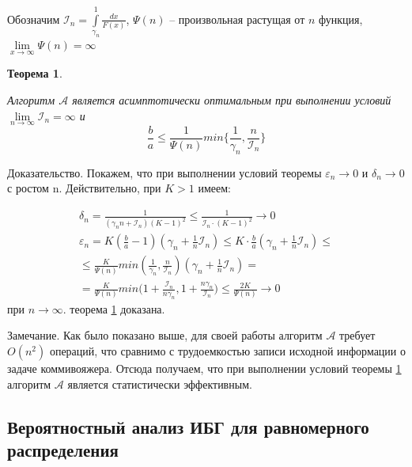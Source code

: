 \documentclass[a4paper, 14pt]{extarticle}
\numberwithin{equation}{section}
\newtheorem{theorem}{Теорема}[section]
\begin{document}
Обозначим $\mathcal{I}_n = \int\limits_{\gamma_n}^1 \frac{dx}{F(x)}$, $\Psi(n)$ -- произвольная растущая от $n$ функция, $\lim\limits_{x\to \infty} \Psi(n) = \infty $ \\

\begin{theorem}
\label{theoremone}

Алгоритм $\mathcal{A}$ является асимптотически оптимальным при выполнении условий $\lim\limits_{{n} \to \infty} \mathcal{I}_n = \infty $ и 
\begin{equation*}
\frac{b}{a} \leqslant \frac{1}{\Psi(n)} min \{ \frac{1}{\gamma_n}, \frac{n}{\mathcal{I}_n} \}
\end{equation*}

\end{theorem}

Доказательство. Покажем, что при выполнении условий теоремы $\varepsilon_n \to 0$ и $\delta_n \to 0$ с ростом n. Действительно, при $K>1$ имеем:

\begin{equation*}
\begin{aligned}
\delta_n = \frac{1}{(\gamma_n n+\mathcal{I}_n)(K-1)^2} \leqslant \frac{1}{\mathcal{I}_n \cdot (K-1)^2} \to 0 \\[10pt]
\varepsilon_n = K(\frac{b}{a}-1)(\gamma_n+\frac{1}{n} \mathcal{I}_n) \leqslant K \cdot \frac{b}{a} (\gamma_n+\frac{1}{n} \mathcal{I}_n)\leqslant \\[10pt]
\leqslant \frac{K}{\Psi(n)} min(\frac{1}{\gamma_n}, \frac{n}{\mathcal{I}_n})(\gamma_n+\frac{1}{n} \mathcal{I}_n) = \\[10pt]
= \frac{K}{\Psi(n)} min \bigg(1+\frac{\mathcal{I}_n}{n \gamma_n}, 1+\frac{n \gamma_n}{\mathcal{I}_n} \bigg) \leqslant \frac{2K}{\Psi(n)} \to 0
\end{aligned}
\end{equation*}
при $n \to \infty$. теорема \ref{theoremone} доказана.

Замечание. Как было показано выше, для своей работы алгоритм $\mathcal{A}$ требует $O(n^2)$ операций, что сравнимо с трудоемкостью записи исходной информации о задаче коммивояжера. Отсюда получаем, что при выполнении условий теоремы \ref{theoremone} алгоритм $\mathcal{A}$ является статистически эффективным.\\


\subsection{Вероятностный анализ ИБГ для равномерного распределения}
\end{document}
